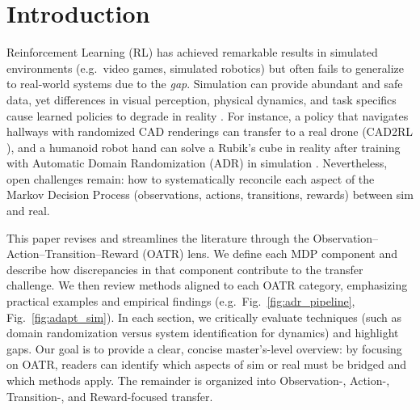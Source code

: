 \section{Introduction}
Reinforcement Learning (RL) has achieved remarkable results in simulated environments (e.g.\ video games, simulated robotics) but often fails to generalize to real-world systems due to the \emph{\simtoreal gap}. Simulation can provide abundant and safe data, yet differences in visual perception, physical dynamics, and task specifics cause learned policies to degrade in reality {\cite{Tobin2017,Sadeghi2017}}. For instance, a policy that navigates hallways with randomized CAD renderings can transfer to a real drone (CAD2RL {\cite{Sadeghi2017}}), and a humanoid robot hand can solve a Rubik’s cube in reality after training with Automatic Domain Randomization (ADR) in simulation {\cite{Akkaya2019}}. Nevertheless, open challenges remain: how to systematically reconcile each aspect of the Markov Decision Process (observations, actions, transitions, rewards) between sim and real. 

This paper revises and streamlines the literature through the Observation–Action–Transition–Reward (OATR) lens. We define each MDP component and describe how discrepancies in that component contribute to the transfer challenge. We then review \simtoreal methods aligned to each OATR category, emphasizing practical examples and empirical findings (e.g.\ Fig.~\ref{fig:adr_pipeline}, Fig.~\ref{fig:adapt_sim}). In each section, we critically evaluate techniques (such as domain randomization versus system identification for dynamics) and highlight gaps. Our goal is to provide a clear, concise master’s-level overview: by focusing on OATR, readers can identify which aspects of sim or real must be bridged and which methods apply. The remainder is organized into Observation-, Action-, Transition-, and Reward-focused transfer.
